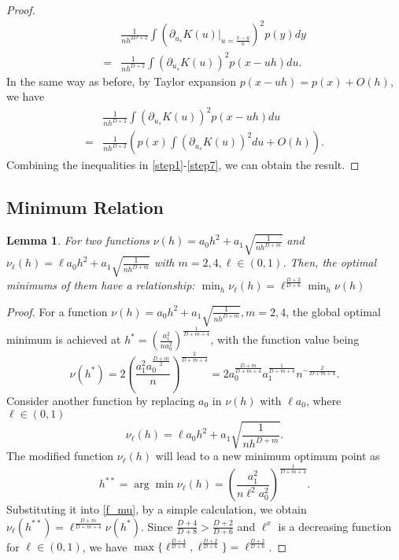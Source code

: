 \documentclass[aos,preprint]{imsart}
\newtheorem{lemma}[theorem]{Lemma}
\theoremstyle{remark}
\begin{document}
\begin{appendix}
\begin{proof}
\begin{equation}\label{step5}
\begin{aligned}
&\frac{1}{n h^{2D+2}} \int (\partial_{u_s } K (u) |_{u=\frac{x - y}{h}})^2 p(y) dy \\
= &\frac{1}{n h^{D+2}} \int (\partial_{u_s } K (u) )^2 p(x-uh) du.
\end{aligned}
\end{equation}\label{step6}
In the same way as before, by Taylor expansion $p(x-uh)=p(x)+O(h)$, we have
\begin{equation}\label{step7}
\begin{aligned}
&\frac{1}{n h^{D+2}} \int (\partial_{u_s } K (u) )^2 p(x-uh) du\\
 = &\frac{1}{n h^{D+2}}  (p(x) \int (\partial_{u_s } K (u) )^2   du + O(h)).
\end{aligned}
\end{equation}
Combining the inequalities in \eqref{step1}-\eqref{step7}, we can obtain the result.
\end{proof}

\subsection{Minimum Relation}
\begin{lemma}\label{improve_lemma}
For two functions $\nu(h) = a_0 h^2 + a_1 \sqrt{\frac{1}{nh^{D+m}}}$ and $\nu_\ell (h) = \ell a_0 h^2 + a_1 \sqrt{\frac{1}{nh^{D+m}}}$ with $m=2,4,\ell \in(0,1)$. Then, the optimal minimums of them have a relationship:  $\min_h \nu_\ell (h) = \ell^{\frac{D+2}{D+6}}\min_h \nu(h)$
\end{lemma} 

\begin{proof}\label{mimimum_proof}
For a function $\nu(h) = a_0 h^2 + a_1 \sqrt{\frac{1}{nh^{D+m}}}, m=2,4$, the global optimal minimum is achieved at $h^* = 
(\frac{a_1^2}{n a_0^2})^{\frac{1}{D+m+4}}$, with the function value being
\[
\nu(h^*) = 2(\frac{a_1^2 a_0^{\frac{D+m}{2}}}{n})^{\frac{2}{D+m+4}}=2 a_0^{\frac{D+m}{D+m+4}} a_1^{\frac{1}{D+m+4}} {n}^{-\frac{2}{D+m+4}}.
\]
Consider another function by replacing $a_0$ in $\nu(h)$ with $\ell a_0$, where $\ell \in(0,1)$
\begin{equation}\label{f_mu}
\nu_\ell (h) = \ell a_0 h^2 + a_1 \sqrt{\frac{1}{nh^{D+m}}}.
\end{equation}
The modified function $\nu_\ell(h)$ will lead to a new minimum optimum point as
\[
h^{**} =\arg\min \nu_\ell( h)=(\frac{a_1^2}{n \ell^2 a_0^2})^{\frac{1}{D+m+4}}.
\] 
Substituting it into \eqref{f_mu}, by a simple calculation, we obtain $\nu_\ell (h^{**}) = \ell^{\frac{D+m}{D+m+4}}\nu(h^*)$.
Since $\frac{D+4}{D+8}>\frac{D+2}{D+6}$ and $\ell^x$ is a decreasing function for $\ell \in (0,1)$, we have $\max\{\ell^{\frac{D+4}{D+8}}, \ell^{\frac{D+2}{D+6}}\} = \ell^{\frac{D+2}{D+6}}$. 
\end{proof}

\end{appendix}
\end{document}
